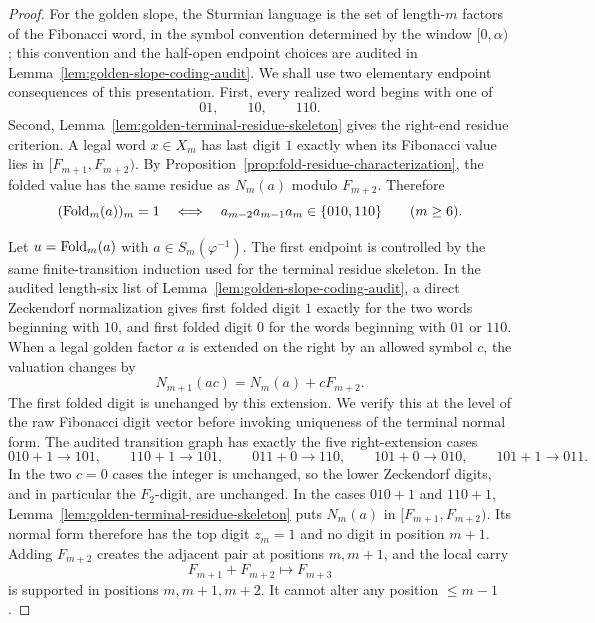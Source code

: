 \begin{proof}
For the golden slope, the Sturmian language is the set of length-\(m\)
factors of the Fibonacci word, in the symbol convention determined by the
window \([0,\alpha)\); this convention and the half-open endpoint choices are
audited in Lemma~\ref{lem:golden-slope-coding-audit}.  We shall use two
elementary endpoint consequences of this presentation.  First, every realized
word begins with one of
\[
01,\qquad 10,\qquad 110.
\]
Second, Lemma~\ref{lem:golden-terminal-residue-skeleton} gives the right-end
residue criterion.  A legal word \(x\in X_m\) has last digit \(1\) exactly when
its Fibonacci value lies in \([F_{m+1},F_{m+2})\).  By
Proposition~\ref{prop:fold-residue-characterization}, the folded value has the
same residue as \(N_m(a)\) modulo \(F_{m+2}\).  Therefore
\[
(\mathrm{Fold}_m(a))_m=1
\quad\Longleftrightarrow\quad
a_{m-2}a_{m-1}a_m\in\{010,110\}
\qquad (m\ge6).
\]

Let \(u=\mathrm{Fold}_m(a)\) with \(a\in S_m(\varphi^{-1})\).  The first endpoint is
controlled by the same finite-transition induction used for the terminal
residue skeleton.  In the audited length-six list of
Lemma~\ref{lem:golden-slope-coding-audit}, a direct Zeckendorf normalization
gives first folded digit \(1\) exactly for the two words beginning with
\(10\), and first folded digit \(0\) for the words beginning with \(01\) or
\(110\).  When a legal golden factor \(a\) is extended on the right by an
  allowed symbol \(c\), the valuation changes by
  \[
  N_{m+1}(ac)=N_m(a)+cF_{m+2}.
  \]
  The first folded digit is unchanged by this extension.  We verify this at the
  level of the raw Fibonacci digit vector before invoking uniqueness of the
  terminal normal form.  The audited transition graph has exactly the five
  right-extension cases
  \[
  010+1\to101,\qquad
  110+1\to101,\qquad
  011+0\to110,\qquad
  101+0\to010,\qquad
  101+1\to011 .
  \]
  In the two \(c=0\) cases the integer is unchanged, so the lower Zeckendorf
  digits, and in particular the \(F_2\)-digit, are unchanged.  In the cases
  \(010+1\) and \(110+1\), Lemma~\ref{lem:golden-terminal-residue-skeleton}
  puts \(N_m(a)\) in \([F_{m+1},F_{m+2})\).  Its normal form therefore has the
  top digit \(z_m=1\) and no digit in position \(m+1\).  Adding \(F_{m+2}\)
  creates the adjacent pair at positions \(m,m+1\), and the local carry
  \[
  F_{m+1}+F_{m+2}\longmapsto F_{m+3}
  \]
  is supported in positions \(m,m+1,m+2\).  It cannot alter any position
  \(\le m-1\).


\end{proof}
